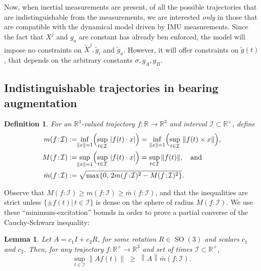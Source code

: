 \documentclass[]{article}
\newtheorem{defn}{Definition}
\newtheorem{lemma}{Lemma}
\def\gw{\tilde{g}}
\def\Xw{\tilde{X}}
\def\RR{\mathbb{R}}
\def\subs{\subset}
\def\SO{\operatorname{SO}}
\def\m{{m}}
\def\M{{M}}
\def\I{\mathcal{I}}
\begin{document}
Now, when inertial measurements are present, of all the possible trajectories that are indistinguishable from the measurements, we are interested {\em only} in those that are compatible with the dynamical model driven by IMU measurements. Since the fact that $X^j$ and $g_a$ are constant has already ben enforced, the model will impose no constraints on $\Xw^j, \gw_i$ and $\gw_a$. However, it will offer constraints on $\gw(t)$, that depends on the arbitrary constants $\sigma, g_A, g_B$. 

\subsection{Indistinguishable trajectories in bearing augmentation}

\begin{defn}
For an $\RR^3$-valued trajectory $f:\RR\to\RR^3$ and interval $\I\subs\RR^+$, define
\begin{align*}
\m(f\!:\!\I)
&:= \!\!\inf_{\|x\|=1}\Bigl(\sup_{t\in \I}\,|{f}(t)\cdot x|\Bigr)
= \inf_{\|x\|=1}\Bigl(\sup_{t\in \I}\,\|{f}(t)\times x\|\Bigr),\\
\M(f\!:\!\I)
&:= \!\!\sup_{\|x\|=1}\Bigl(\sup_{t\in\I}\,|{f}(t)\cdot x|\Bigr) = \sup_{t\in\I}\|{f}(t)\|
,
\quad\text{and}\\
\bar\m(f\!:\!\I) &:= \sqrt{\max\{0,\, 2\m(f\!:\!\I)^2 - \M(f\!:\!\I)^2\}}.
\end{align*}
\end{defn}
Observe that $\M(f\!:\!\I) \geq \m(f\!:\!\I) \geq \bar\m(f\!:\!\I)$, and that the inequalities are strict unless
$\{\pm f(t)|\,t\in\I\}$ is dense on the sphere of radius $\M(f\!:\!\I)$.  We use these ``minimum-excitation''
bounds in order to prove a partial converse of the Cauchy-Schwarz inequality:
\begin{lemma}
Let $A = c_1I + c_2R$, for some rotation $R\in\SO(3)$ and scalars $c_1$ and $c_2$.
Then, for any trajectory $f:\RR^+\to\RR^3$ and set of times $\I\subs\RR^+$,
$$\sup_{t\in \I} \left\|A f(t)\right\| \;\geq\;
\left\|A\right\|\bar\m(f\!:\!\I).
$$
\end{lemma}
\end{document}

